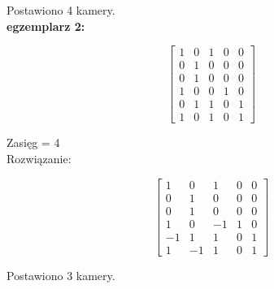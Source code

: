 \documentclass[15pt, a4paper]{article}
\begin{document}
Postawiono 4 kamery. \\


\textbf{egzemplarz 2:}

\[
\begin{bmatrix}
1 & 0 & 1 & 0 & 0 \\
0 & 1 & 0 & 0 & 0 \\
0 & 1 & 0 & 0 & 0 \\
1 & 0 & 0 & 1 & 0 \\
0 & 1 & 1 & 0 & 1 \\
1 & 0 & 1 & 0 & 1
\end{bmatrix}
\]

Zasięg = 4 \\

Rozwiązanie:

\[
\begin{bmatrix}
1 & 0 & 1 & 0 & 0 \\
0 & 1 & 0 & 0 & 0 \\
0 & 1 & 0 & 0 & 0 \\
1 & 0 & -1 & 1 & 0 \\
-1 & 1 & 1 & 0 & 1 \\
1 & -1 & 1 & 0 & 1
\end{bmatrix}
\]

Postawiono 3 kamery.

\vspace{0.5cm}
\end{document}
